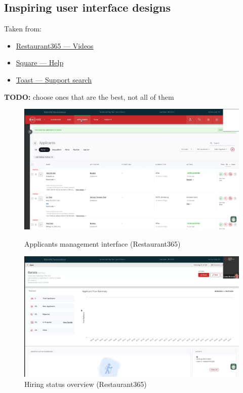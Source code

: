 \documentclass[]{VUMIFTemplateClass}
\newcommand{\todocomment}[1]{%
    \begin{tcolorbox}[colback=red!20, colframe=red!60, arc=0pt, outer arc=0pt, boxrule=1pt, left=3pt, right=3pt, top=3pt, bottom=3pt]
        \textbf{\textcolor{orange!70!black}{TODO:}} #1
    \end{tcolorbox}
}
\begin{document}
\subsection{Inspiring user interface designs}


Taken from:
\begin{itemize}
     \item \href{https://www.restaurant365.com/resource-category/videos/}{Restaurant365 — Videos}
     \item \href{https://squareup.com/help/us/en}{Square — Help}
     \item \href{https://support.toasttab.com/search/#f-100=Account%20Settings%20%26%20Billing,Marketing,Menu%20%26%20Items,POS%20%26%20Location%20Operations,Takeout%20%26%20Catering&f-@commonsource=Videos&f-@language=English}{Toast — Support search}
\end{itemize}

\todocomment{choose ones that are the best, not all of them}

\begin{figure}[h]
    \centering
    \begin{minipage}{0.48\textwidth}
        \centering
        \includegraphics[width=\textwidth]{images/examples/applicants_r365.png}
        \caption{Applicants management interface (Restaurant365)}
    \end{minipage}
    \hfill
    \begin{minipage}{0.48\textwidth}
        \centering
        \includegraphics[width=\textwidth]{images/examples/hiring_status_r365.png}
        \caption{Hiring status overview (Restaurant365)}
    \end{minipage}
\end{figure}
\end{document}
